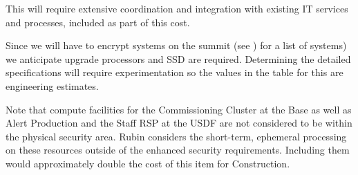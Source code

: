 This will require extensive coordination and integration with existing \gls{IT}
services and processes, included as part of this cost.

Since we will have to encrypt systems on the summit (see ) for a list of systems)
we anticipate upgrade processors and \gls{SSD} are required. Determining the detailed specifications will require experimentation so the
values in the table for this are engineering estimates.

Note that compute facilities for the \gls{Commissioning} Cluster at the Base as well as Alert Production and the Staff RSP at the USDF are not considered to be within the physical security area.
Rubin considers the short-term, ephemeral processing on these resources outside of the enhanced security requirements. Including them would approximately double the cost of this item for \gls{Construction}.
